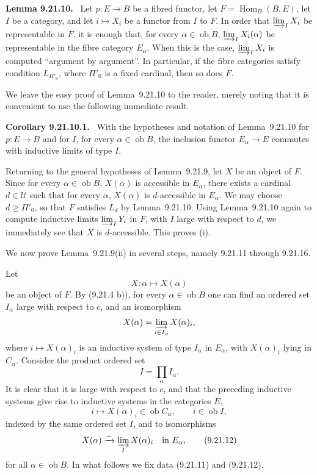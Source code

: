 \documentclass[11pt]{article}
\newcommand{\U}{\mathcal{U}}
\newcommand{\ob}{\operatorname{ob}}
\newcommand{\Hhom}{\operatorname{Hom}}
\newcommand{\xto}[1]{\xrightarrow{#1}}
\newenvironment{statement}[1]{\par\medskip\noindent\textbf{#1.}\ }{\par\medskip}
\begin{document}
\begin{statement}{Lemma 9.21.10}
Let $p:E\to B$ be a fibred functor, let $F=\Hhom_B(B,E)$, let $I$ be a category, and let $i\mapsto X_i$ be a functor from $I$ to $F$. In order that $\varinjlim_I X_i$ be representable in $F$, it is enough that, for every $\alpha\in\ob B$, $\varinjlim_I X_i(\alpha)$ be representable in the fibre category $E_\alpha$. When this is the case, $\varinjlim_I X_i$ is computed ``argument by argument''. In particular, if the fibre categories satisfy condition $L_{\Pi'_0}$, where $\Pi'_0$ is a fixed cardinal, then so does $F$.
\end{statement}

We leave the easy proof of Lemma~9.21.10 to the reader, merely noting that it is convenient to use the following immediate result.

\begin{statement}{Corollary 9.21.10.1}
With the hypotheses and notation of Lemma~9.21.10 for $p:E\to B$ and for $I$, for every $\alpha\in\ob B$, the inclusion functor $E_\alpha\to E$ commutes with inductive limits of type $I$.
\end{statement}

Returning to the general hypotheses of Lemma~9.21.9, let $X$ be an object of $F$. Since for every $\alpha\in\ob B$, $X(\alpha)$ is accessible in $E_\alpha$, there exists a cardinal $d\in\U$ such that for every $\alpha$, $X(\alpha)$ is $d$-accessible in $E_\alpha$. We may choose $d\geq\Pi'_0$, so that $F$ satisfies $L_d$ by Lemma~9.21.10. Using Lemma~9.21.10 again to compute inductive limits $\varinjlim_I Y_i$ in $F$, with $I$ large with respect to $d$, we immediately see that $X$ is $d$-accessible. This proves (i).

We now prove Lemma~9.21.9(ii) in several steps, namely 9.21.11 through 9.21.16.

Let
\[
 X:\alpha\longmapsto X(\alpha)
\]
be an object of $F$. By (9.21.4 b)), for every $\alpha\in\ob B$ one can find an ordered set $I_\alpha$ large with respect to $c$, and an isomorphism
\[
 X(\alpha)=\varinjlim_{i\in I_\alpha}X(\alpha)_i,
\]
where $i\mapsto X(\alpha)_i$ is an inductive system of type $I_\alpha$ in $E_\alpha$, with $X(\alpha)_i$ lying in $C_\alpha$. Consider the product ordered set
\[
 I=\prod_\alpha I_\alpha.
\]
It is clear that it is large with respect to $c$, and that the preceding inductive systems give rise to inductive systems in the categories $E$,
\begin{equation}
 i\longmapsto X(\alpha)_i\in\ob C_\alpha,\qquad i\in\ob I,
 \tag{9.21.11}
\end{equation}
indexed by the same ordered set $I$, and to isomorphisms
\begin{equation}
 X(\alpha)\xto{\sim}\varinjlim_I X(\alpha)_i
 \quad\hbox{in }E_\alpha,
 \tag{9.21.12}
\end{equation}
for all $\alpha\in\ob B$. In what follows we fix data (9.21.11) and (9.21.12).
\end{document}
